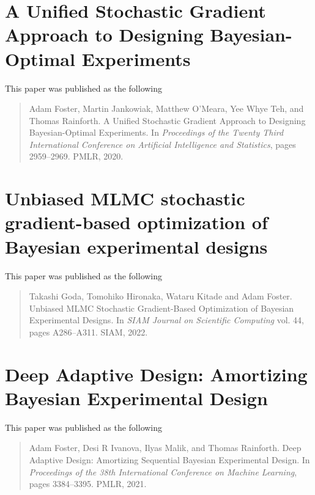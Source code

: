 \documentclass[a4paper, 10pt]{report}
\theoremstyle{plain}
\begin{document}
	
	
	
	
	\chapter{A Unified Stochastic Gradient Approach to Designing Bayesian-Optimal Experiments}
	\label{chap:sgboed}
	This paper was published as the following
	\begin{quote}
		Adam Foster, Martin Jankowiak, Matthew O'Meara, Yee Whye Teh, and Thomas Rainforth. A Unified Stochastic Gradient Approach to Designing Bayesian-Optimal Experiments.  In \emph{Proceedings of the Twenty Third International Conference on Artificial Intelligence and Statistics}, pages 2959--2969. PMLR, 2020.
	\end{quote}
	
	
	
	\chapter{Unbiased MLMC stochastic gradient-based optimization of Bayesian experimental designs}
	\label{chap:mlmc}
	This paper was published as the following
	\begin{quote}
		Takashi Goda, Tomohiko Hironaka, Wataru Kitade and Adam Foster. Unbiased MLMC Stochastic Gradient-Based Optimization of Bayesian Experimental Designs. In \emph{SIAM Journal on Scientific Computing} vol. 44, pages A286--A311. SIAM, 2022.
	\end{quote}
	
	
	
	\chapter{Deep Adaptive Design: Amortizing Bayesian Experimental Design}
	\label{chap:dad}
	This paper was published as the following
	\begin{quote}
		Adam Foster, Desi R Ivanova, Ilyas Malik, and Thomas Rainforth. Deep Adaptive Design: Amortizing Sequential Bayesian Experimental Design. In \emph{Proceedings of the 38th International Conference on Machine Learning}, pages 3384--3395. PMLR, 2021.
	\end{quote}
	
	
	
\end{document}

